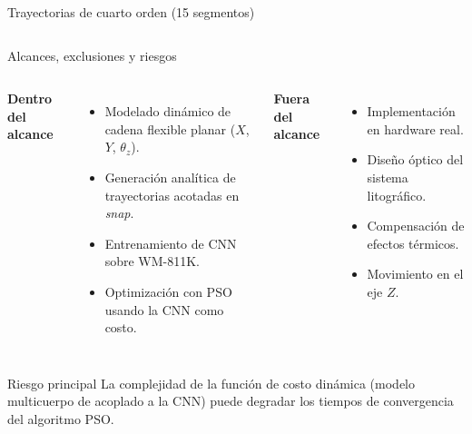 \documentclass[en,16:9,navbarinline,bigfoot]{sdqbeamer}
\begin{document}
\begin{frame}{Trayectorias de cuarto orden (15 segmentos)}
\begin{columns}
\begin{center}
{
          }
        \end{center}
    \end{columns}
\end{frame}

\begin{frame}{Alcances, exclusiones y riesgos}
    \begin{columns}
        \textbf{Dentro del alcance}
        \begin{itemize}
            \item Modelado dinámico de cadena flexible planar ($X$, $Y$, $\theta_z$).
            \item Generación analítica de trayectorias acotadas en \textit{snap}.
            \item Entrenamiento de CNN sobre WM-811K.
            \item Optimización con PSO usando la CNN como costo.
        \end{itemize}
        \textbf{Fuera del alcance}
        \begin{itemize}
            \item Implementación en hardware real.
            \item Diseño óptico del sistema litográfico.
            \item Compensación de efectos térmicos.
            \item Movimiento en el eje $Z$.
        \end{itemize}
    \end{columns}
    \vspace{0.25cm}
    \begin{redblock}{Riesgo principal}
        La complejidad de la función de costo dinámica (modelo multicuerpo de \cite{Al-Rawashdeh2022_Caracterization} acoplado a la CNN) puede degradar los tiempos de convergencia del algoritmo PSO.
    \end{redblock}
\end{frame}
\end{document}
